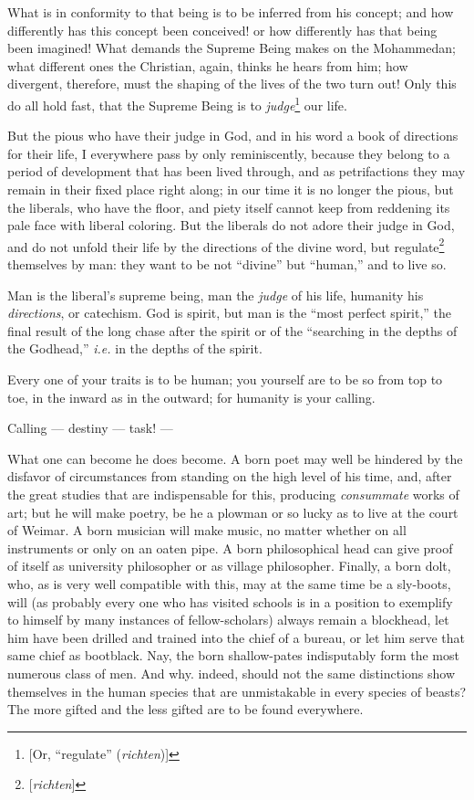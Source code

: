 What is in conformity to that being is to be inferred from his concept; and 
how differently has this concept been conceived! or how differently has that 
being been imagined! What demands the Supreme Being makes on the Mohammedan; 
what different ones the Christian, again, thinks he hears from him; how 
divergent, therefore, must the shaping of the lives of the two turn out! Only 
this do all hold fast, that the Supreme Being is to 
\textit{judge}\footnote{[Or, ``regulate'' (\textit{richten})]} our life.

But the pious who have their judge in God, and in his word a book of 
directions for their life, I everywhere pass by only reminiscently, because 
they belong to a period of development that has been lived through, and as 
petrifactions they may remain in their fixed place right along; in our time it 
is no longer the pious, but the liberals, who have the floor, and piety itself 
cannot keep from reddening its pale face with liberal coloring. But the 
liberals do not adore their judge in God, and do not unfold their life by the 
directions of the divine word, but regulate\footnote{[\textit{richten}]} 
themselves by man: they want to be not ``divine'' but ``human,'' and to 
live so.

Man is the liberal's supreme being, man the \textit{judge} of his life, 
humanity his \textit{directions}, or catechism. God is spirit, but man is the 
``most perfect spirit,'' the final result of the long chase after the spirit 
or of the ``searching in the depths of the Godhead,'' \textit{i.e.} in the 
depths of the spirit.

Every one of your traits is to be human; you yourself are to be so from top to 
toe, in the inward as in the outward; for humanity is your calling.

Calling --- destiny --- task! ---

What one can become he does become. A born poet may well be hindered by the 
disfavor of circumstances from standing on the high level of his time, and, 
after the great studies that are indispensable for this, producing 
\textit{consummate} works of art; but he will make poetry, be he a plowman or 
so lucky as to live at the court of Weimar. A born musician will make music, 
no matter whether on all instruments or only on an oaten pipe. A born 
philosophical head can give proof of itself as university philosopher or as 
village philosopher. Finally, a born dolt, who, as is very well compatible 
with this, may at the same time be a sly-boots, will (as probably every one 
who has visited schools is in a position to exemplify to himself by many 
instances of fellow-scholars) always remain a blockhead, let him have been 
drilled and trained into the chief of a bureau, or let him serve that same 
chief as bootblack. Nay, the born shallow-pates indisputably form the most 
numerous class of men. And why. indeed, should not the same distinctions show 
themselves in the human species that are unmistakable in every species of 
beasts? The more gifted and the less gifted are to be found everywhere.

